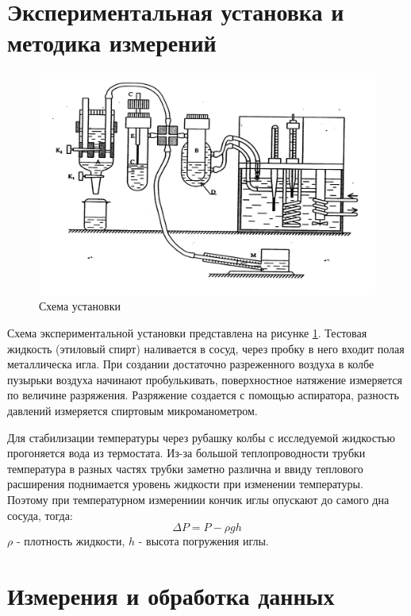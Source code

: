 \documentclass[a4paper,12pt]{article} %
\begin{document}
\section{Экспериментальная установка и методика измерений}
\begin{figure}[h!]
\begin{center}
\includegraphics[width=\textwidth]{Установка}
\end{center}
\caption{Схема установки} \label{установка}
\end{figure}
Схема экспериментальной установки представлена на рисунке \ref{установка}.
Тестовая жидкость (этиловый спирт) наливается в сосуд, через пробку в него входит полая металлическа игла. При создании достаточно разреженного воздуха в колбе пузырьки воздуха начинают пробулькивать, поверхностное натяжение измеряется по величине разряжения. Разряжение создается с помощью аспиратора, разность давлений измеряется спиртовым микроманометром.

Для стабилизации температуры через рубашку колбы с исследуемой жидкостью прогоняется вода из термостата. Из-за большой теплопроводности трубки температура в разных частях трубки заметно различна и ввиду теплового расширения поднимается уровень жидкости при изменении температуры. Поэтому при температурном измерениии кончик иглы опускают до самого дна сосуда, тогда:
\begin{equation}
\Delta P = P - \rho g h
\end{equation}
$\rho$ - плотность жидкости, $h$ - высота погружения иглы.

\section{Измерения и обработка данных}
\end{document}
